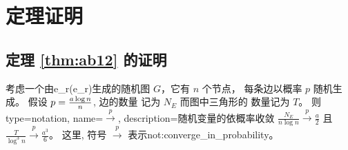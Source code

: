 \section{定理证明}
\subsection{定理 \ref{thm:ab12} 的证明}
\begin{lemma}\label{lem:ER_tr_counting}
  考虑一个由\gls{e_r}(\glsdesc{e_r})生成的随机图 $G$，它有  $n$
  个节点， 每条边以概率 $p$ 随机生成\cite{erdHos1960evolution}。
   假设
	$p=\frac{a \log n}{n}$, 边的数量
  记为  $N_E$ 
  而图中三角形的
  数量记为  $T$。 则
{
  type=notation,
  name={$\xrightarrow{p}$},
  description={随机变量的依概率收敛}
}
	$\frac{N_E}{n \log n} \xrightarrow{p} \frac{a}{2}$ 且
  $\frac{T}{\log^3 n} \xrightarrow{p} \frac{a^3}{6}$。
  这里, 符号 $\xrightarrow{p}$ 表示\glsdesc{not:converge_in_probability}。
\end{lemma}
